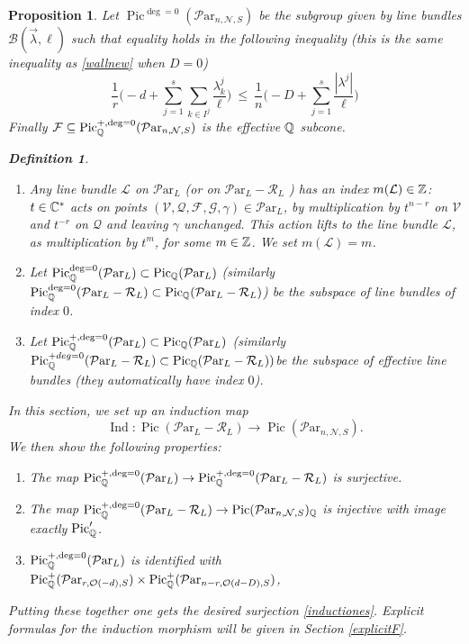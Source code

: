 \documentclass[11pt]{amsart}
\newcommand\op{\operatorname}
\newcommand\mf{\mathcal{F}}
\newcommand\Pic{\operatorname{Pic}}
\newcommand\mv{\mathcal{V}}
\newcommand\ml{\mathcal{L}}
\newcommand\mg{\mathcal{G}}
\newcommand\mq{\mathcal{Q}}
\newcommand\mn{\mathcal{N}}
\newcommand\ParL{\mathcal{P}\text{ar}_L}
\newcommand\Par{\mathcal{P}\text{ar} }
\newtheorem{proposition}[theorem]{Proposition}
\newtheorem{defi}[theorem]{Definition}
\numberwithin{theorem}{subsection}
\begin{document}
{\begin{proposition}
Let $\Pic^{\deg=0}(\Par_{n,\mn,S})$ be the subgroup given by line bundles $\mathcal{B}(\vec{\lambda},\ell)$ such that  equality holds in the following inequality (this is the same inequality as \eqref{wallnew} when $D=0$)
\begin{equation}\label{wallneww}
\frac{1}{r}\bigl(-d+\sum_{j=1}^s\sum_{k\in I^j} \frac{\lambda^j_k}{\ell}\bigr)\ \leq\  \frac{1}{n}\bigl(-D +\sum_{j=1}^s \frac{|\lambda^j|}{\ell}\bigr)
\end{equation}
Finally $\mf\subseteq \Pic^{+,\deg=0}_{\Bbb{Q}}(\Par_{n,\mn,S})$ is the effective $\Bbb{Q}$ subcone.
\begin{defi}\label{Pin}
\begin{enumerate}
\item Any line bundle $\ml$ on $\ParL$ (or on $\ParL-\mathcal{R}_L$ ) has an index $m(\mathcal{L})\in \Bbb{Z}$: $t\in\Bbb{C}^*$ acts on points $(\mv,\mq,\mf,\mg,\gamma)\in\ParL$, by multiplication
by $t^{n-r}$ on $\mv$ and $t^{-r}$ on $\mq$ and leaving $\gamma$ unchanged. This action lifts to the line bundle $\ml$, as multiplication by $t^m$, for some $m\in\Bbb{Z}$. We set $m(\mathcal{L})=m$.
\item Let $\Pic^{\deg=0}_{\Bbb{Q}}(\ParL)\subset \Pic_{\Bbb{Q}}(\ParL)$ (similarly $\Pic^{\deg=0}_{\Bbb{Q}}(\ParL-\mathcal{R}_L)\subset \Pic_{\Bbb{Q}}(\ParL-\mathcal{R}_L)$) be  the subspace of line bundles of index $0$.
\item Let $\Pic^{+,\deg=0}_{\Bbb{Q}}(\ParL)\subset \Pic_{\Bbb{Q}}(\ParL)$ (similarly $\Pic^{+deg=0}_{\Bbb{Q}}(\ParL-\mathcal{R}_L)\subset \Pic_{\Bbb{Q}}(\ParL-\mathcal{R}_L))$be  the subspace of effective line bundles (they automatically have  index $0$).
\end{enumerate}
\end{defi}
In this section, we set up an induction map
\begin{equation}\label{inducto}
\op{Ind}:\Pic(\ParL-\mathcal{R}_L)\to \Pic(\Par_{n,\mn,S}).
\end{equation}
We then show the following properties:
\begin{enumerate}
\item [(I1)] The map $\Pic^{+,\deg=0}_{\Bbb{Q}}(\ParL)\to \Pic^{+,\deg=0}_{\Bbb{Q}}(\ParL-\mathcal{R}_L)$ is surjective.
\item[(I2)] The map $\Pic^{+,\deg=0}_{\Bbb{Q}}(\ParL-\mathcal{R}_L)\to \Pic(\Par_{n,\mn,S})_{\Bbb{Q}}$
is injective with image exactly $\Pic'_{\Bbb{Q}}$.
\item[(I3)]  $\Pic^{+,\deg=0}_{\Bbb{Q}}(\ParL)$ is identified with  $\Pic^+_{\Bbb{Q}}(\Par_{r,\mathcal{O}(-d),S})\times \Pic^+_{\Bbb{Q}}(\Par_{n-r,\mathcal{O}(d-D),S})$,
\end{enumerate}
Putting these together one gets the desired surjection \eqref{inductiones}. Explicit formulas for the induction morphism will be given in Section \ref{explicitF}.


\end{proposition}}
\end{document}
